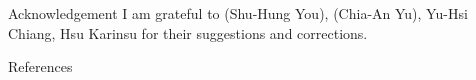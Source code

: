 \begin{frame}{Acknowledgement}
  I am grateful to  (Shu-Hung You),  (Chia-An
  Yu), Yu-Hsi Chiang,
  Hsu Karinsu for their suggestions and corrections.
\end{frame}

\begin{frame}[allowframebreaks]{References}


 

\end{frame}



